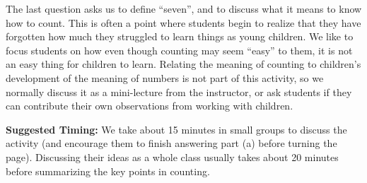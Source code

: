 \documentclass{ximera}
\begin{document}
\begin{instructorNotes}
The last question asks us to define ``seven'', and to discuss what it means to know how to count.  This is often a point where students begin to realize that they have forgotten how much they struggled to learn things as young children.  We like to focus students on how even though counting may seem ``easy'' to them, it is not an easy thing for children to learn.
Relating the meaning of counting to children's development of the meaning of numbers is not part of this activity, so we normally discuss it as a mini-lecture from the instructor, or ask students if they can contribute their own observations from working with children.


{\bf Suggested Timing:} We take about 15 minutes in small groups to discuss the activity (and encourage them to finish answering part (a) before turning the page).  %
Discussing their ideas as a whole class usually takes about 20 minutes before summarizing the key points in counting.  



\end{instructorNotes}
\end{document}

